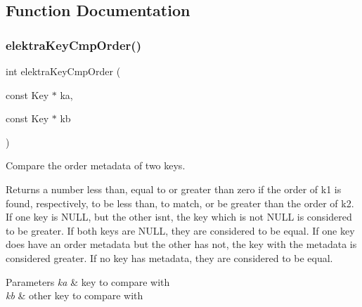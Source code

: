 \subsection{Function Documentation}
\mbox{\label{group__meta_gab8b30dfabb0867bd6899e60e7bd193a2}} 
\subsubsection{\texorpdfstring{elektra\+Key\+Cmp\+Order()}{elektraKeyCmpOrder()}}
{\footnotesize\ttfamily int elektra\+Key\+Cmp\+Order (\begin{DoxyParamCaption}\item[{const Key $\ast$}]{ka,  }\item[{const Key $\ast$}]{kb }\end{DoxyParamCaption})}



Compare the order metadata of two keys. 

\begin{DoxyReturn}{Returns}
a number less than, equal to or greater than zero if the order of k1 is found, respectively, to be less than, to match, or be greater than the order of k2. If one key is N\+U\+LL, but the other isn\textquotesingle{}t, the key which is not N\+U\+LL is considered to be greater. If both keys are N\+U\+LL, they are considered to be equal. If one key does have an order metadata but the other has not, the key with the metadata is considered greater. If no key has metadata, they are considered to be equal.
\end{DoxyReturn}

\begin{DoxyParams}{Parameters}
{\em ka} & key to compare with \\
\hline
{\em kb} & other key to compare with \\
\hline
\end{DoxyParams}
\mbox{\label{group__meta_ga166c65c4eb2d758ced57b0bd74fb9a57}} 
